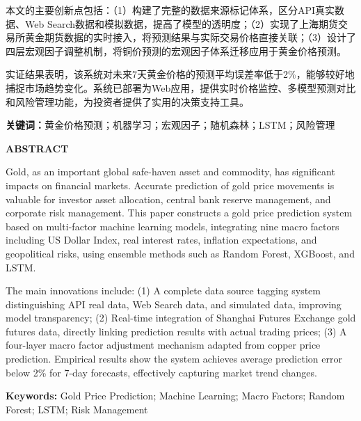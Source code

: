 \documentclass[UTF8,a4paper,12pt]{ctexart}
\begin{document}
本文的主要创新点包括：（1）构建了完整的数据来源标记体系，区分API真实数据、Web Search数据和模拟数据，提高了模型的透明度；（2）实现了上海期货交易所黄金期货数据的实时接入，将预测结果与实际交易价格直接关联；（3）设计了四层宏观因子调整机制，将铜价预测的宏观因子体系迁移应用于黄金价格预测。

实证结果表明，该系统对未来7天黄金价格的预测平均误差率低于2\%，能够较好地捕捉市场趋势变化。系统已部署为Web应用，提供实时价格监控、多模型预测对比和风险管理功能，为投资者提供了实用的决策支持工具。

\vspace{1em}
\noindent\textbf{关键词：}黄金价格预测；机器学习；宏观因子；随机森林；LSTM；风险管理

\newpage

\begin{center}
    {\bfseries ABSTRACT}
\end{center}

\vspace{0.5em}

Gold, as an important global safe-haven asset and commodity, has significant impacts on financial markets. Accurate prediction of gold price movements is valuable for investor asset allocation, central bank reserve management, and corporate risk management. This paper constructs a gold price prediction system based on multi-factor machine learning models, integrating nine macro factors including US Dollar Index, real interest rates, inflation expectations, and geopolitical risks, using ensemble methods such as Random Forest, XGBoost, and LSTM.

The main innovations include: (1) A complete data source tagging system distinguishing API real data, Web Search data, and simulated data, improving model transparency; (2) Real-time integration of Shanghai Futures Exchange gold futures data, directly linking prediction results with actual trading prices; (3) A four-layer macro factor adjustment mechanism adapted from copper price prediction. Empirical results show the system achieves average prediction error below 2\% for 7-day forecasts, effectively capturing market trend changes.

\vspace{1em}
\noindent\textbf{Keywords: }Gold Price Prediction; Machine Learning; Macro Factors; Random Forest; LSTM; Risk Management

\newpage
\tableofcontents
\end{document}
